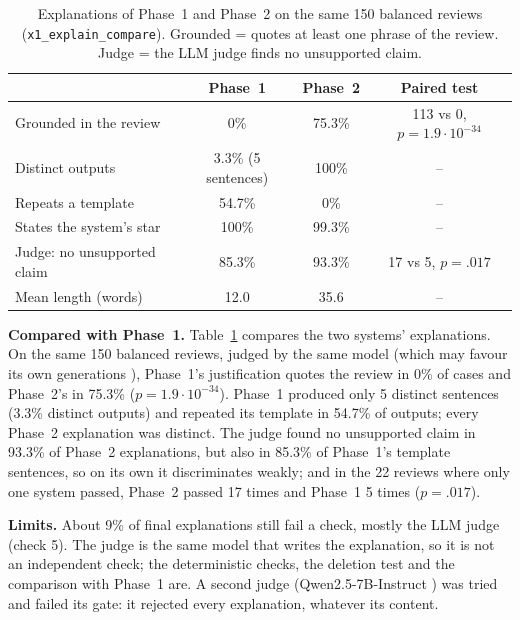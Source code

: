 \documentclass[runningheads]{llncs}
\begin{document}
\begin{table}[t]
\centering
\caption{Explanations of Phase~1 and Phase~2 on the same 150 balanced reviews (\texttt{x1\_explain\_compare}). Grounded = quotes at least one phrase of the review. Judge = the LLM judge finds no unsupported claim.}
\label{tbl:x1}
\small
\begin{tabular}{lccc}
\toprule
 & Phase~1 & Phase~2 & Paired test \\
\midrule
Grounded in the review & 0\% & 75.3\% & 113 vs 0, $p=1.9\cdot10^{-34}$ \\
Distinct outputs & 3.3\% (5 sentences) & 100\% & -- \\
Repeats a template & 54.7\% & 0\% & -- \\
States the system's star & 100\% & 99.3\% & -- \\
Judge: no unsupported claim & 85.3\% & 93.3\% & 17 vs 5, $p=.017$ \\
Mean length (words) & 12.0 & 35.6 & -- \\
\bottomrule
\end{tabular}
\end{table}

\textbf{Compared with Phase~1.} Table~\ref{tbl:x1} compares the two systems' explanations. On the same 150 balanced reviews, judged by the same model (which may favour its own generations \cite{panickssery2024self}), Phase~1's justification quotes the review in 0\% of cases and Phase~2's in 75.3\% ($p = 1.9\cdot10^{-34}$). Phase~1 produced only 5 distinct sentences (3.3\% distinct outputs) and repeated its template in 54.7\% of outputs; every Phase~2 explanation was distinct. The judge found no unsupported claim in 93.3\% of Phase~2 explanations, but also in 85.3\% of Phase~1's template sentences, so on its own it discriminates weakly; and in the 22 reviews where only one system passed, Phase~2 passed 17 times and Phase~1 5 times ($p=.017$).

\textbf{Limits.} About 9\% of final explanations still fail a check, mostly the LLM judge (check 5). The judge is the same model that writes the explanation, so it is not an independent check; the deterministic checks, the deletion test and the comparison with Phase~1 are. A second judge (Qwen2.5-7B-Instruct \cite{qwen2025qwen25}) was tried and failed its gate: it rejected every explanation, whatever its content.
\end{document}
